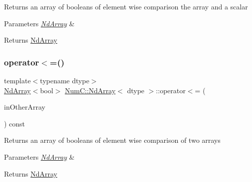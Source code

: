 Returns an array of booleans of element wise comparison the array and a scalar


\begin{DoxyParams}{Parameters}
{\em \mbox{\hyperlink{class_num_c_1_1_nd_array}{Nd\+Array}}} & \\
\hline
\end{DoxyParams}
\begin{DoxyReturn}{Returns}
\mbox{\hyperlink{class_num_c_1_1_nd_array}{Nd\+Array}} 
\end{DoxyReturn}
\mbox{\label{class_num_c_1_1_nd_array_ab99797f22be77924d4c54a6c54829fa1}} 
\subsubsection{\texorpdfstring{operator$<$=()}{operator<=()}\hspace{0.1cm}{\footnotesize\ttfamily [2/2]}}
{\footnotesize\ttfamily template$<$typename dtype$>$ \\
\mbox{\hyperlink{class_num_c_1_1_nd_array}{Nd\+Array}}$<$bool$>$ \mbox{\hyperlink{class_num_c_1_1_nd_array}{Num\+C\+::\+Nd\+Array}}$<$ dtype $>$\+::operator$<$= (\begin{DoxyParamCaption}\item[{const \mbox{\hyperlink{class_num_c_1_1_nd_array}{Nd\+Array}}$<$ dtype $>$ \&}]{in\+Other\+Array }\end{DoxyParamCaption}) const\hspace{0.3cm}{\ttfamily [inline]}}

Returns an array of booleans of element wise comparison of two arrays


\begin{DoxyParams}{Parameters}
{\em \mbox{\hyperlink{class_num_c_1_1_nd_array}{Nd\+Array}}} & \\
\hline
\end{DoxyParams}
\begin{DoxyReturn}{Returns}
\mbox{\hyperlink{class_num_c_1_1_nd_array}{Nd\+Array}} 
\end{DoxyReturn}
\mbox{\label{class_num_c_1_1_nd_array_a77394f32f4c803587139f379ebd738d0}} 
